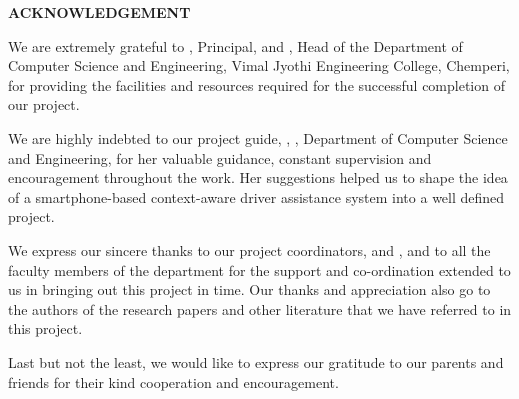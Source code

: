 \newpage
\thispagestyle{plain}
\begin{center}
  \vspace*{30pt}
  {\fontsize{18}{22}\selectfont\textbf{ACKNOWLEDGEMENT}}\par
\end{center}
\vspace{10pt}

We are extremely grateful to \textbf{\principal}, Principal, and \textbf{\hod}, Head of the Department of Computer Science and Engineering, Vimal Jyothi Engineering College, Chemperi, for providing the facilities and resources required for the successful completion of our project.

We are highly indebted to our project guide, \textbf{\guide}, \guidedes, Department of Computer Science and Engineering, for her valuable guidance, constant supervision and encouragement throughout the work. Her suggestions helped us to shape the idea of a smartphone-based context-aware driver assistance system into a well defined project.

We express our sincere thanks to our project coordinators, \textbf{\projcordinatorA} and \textbf{\projcordinatorB}, and to all the faculty members of the department for the support and co-ordination extended to us in bringing out this project in time. Our thanks and appreciation also go to the authors of the research papers and other literature that we have referred to in this project.

Last but not the least, we would like to express our gratitude to our parents and friends for their kind cooperation and encouragement.

\vspace*{20pt}
\begin{flushright}
  \textbf{\studentA}\\
  \textbf{\studentB}\\
  \textbf{\studentC}\\
  \textbf{\studentD}
\end{flushright}
